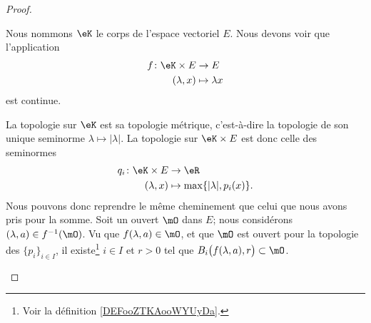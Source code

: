 \begin{proof}
\begin{subproof}
		\spitem[Produit]
		Nous nommons \( \eK\) le corps de l'espace vectoriel \( E\). Nous devons voir que l'application
		\begin{equation}
			\begin{aligned}
				f\colon \eK\times E & \to E             \\
				(\lambda,x)         & \mapsto \lambda x
			\end{aligned}
		\end{equation}
		est continue.

		La topologie sur \( \eK\) est sa topologie métrique, c'est-à-dire la topologie de son unique seminorme \( \lambda\mapsto | \lambda |\). La topologie sur \( \eK\times E\) est donc celle des seminormes
		\begin{equation}        \label{EQooFSBEooWDsHot}
			\begin{aligned}
				q_i\colon \eK\times E & \to \eR                                \\
				(\lambda,x)           & \mapsto \max\{ | \lambda |, p_i(x) \}.
			\end{aligned}
		\end{equation}
		Nous pouvons donc reprendre le même cheminement que celui que nous avons pris pour la somme. Soit un ouvert \( \mO\) dans \( E\); nous considérons \( (\lambda, a)\in f^{-1}(\mO)\). Vu que \( f(\lambda, a)\in \mO\), et que \( \mO\) est ouvert pour la topologie des \( \{ p_i \}_{i\in I}\), il existe\footnote{Voir la définition \ref{DEFooZTKAooWYUyDa}.} \( i\in I\) et \( r>0\) tel que \( B_i\big( f(\lambda,a), r \big)\subset\mO\).





\end{subproof}
\end{proof}
